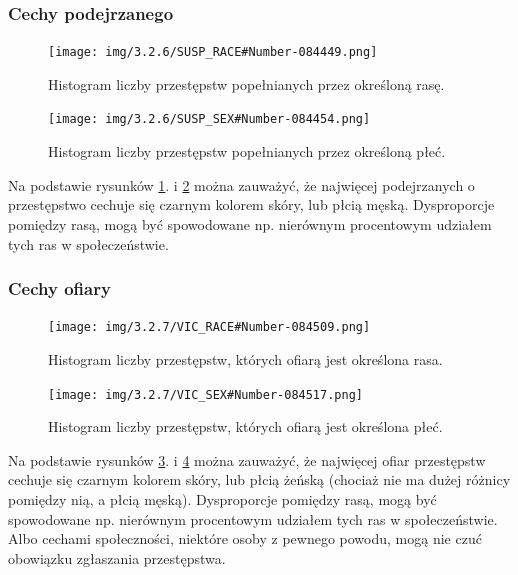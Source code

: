 \documentclass{classrep}
\begin{document}
{{            \subsubsection{Cechy podejrzanego} {
                \begin{figure}[!htbp]
                    \centering
                    \texttt{[image: img/3.2.6/SUSP\_RACE\#Number-084449.png]}
                    \caption{Histogram liczby przestępstw popełnianych przez określoną rasę.}
                    \label{susp_race}
                \end{figure}
                \begin{figure}[!htbp]
                    \centering
                    \texttt{[image: img/3.2.6/SUSP\_SEX\#Number-084454.png]}
                    \caption{Histogram liczby przestępstw popełnianych przez określoną płeć.}
                    \label{susp_sex}
                \end{figure}
                \FloatBarrier
                Na podstawie rysunków \ref{susp_race}. i \ref{susp_sex} można zauważyć, że najwięcej podejrzanych o przestępstwo cechuje się czarnym kolorem skóry, lub płcią męską. Dysproporcje pomiędzy rasą, mogą być spowodowane np. nierównym procentowym udziałem tych ras w społeczeństwie.
            }

            \subsubsection{Cechy ofiary} {
                 \begin{figure}[!htbp]
                    \centering
                    \texttt{[image: img/3.2.7/VIC\_RACE\#Number-084509.png]}
                    \caption{Histogram liczby przestępstw, których ofiarą jest określona rasa.}
                    \label{vic_race}
                \end{figure}
                \begin{figure}[!htbp]
                    \centering
                    \texttt{[image: img/3.2.7/VIC\_SEX\#Number-084517.png]}
                    \caption{Histogram liczby przestępstw, których ofiarą jest określona płeć.}
                    \label{vic_sex}
                \end{figure}
                \FloatBarrier
                
                Na podstawie rysunków \ref{vic_race}. i \ref{vic_sex} można zauważyć, że najwięcej ofiar przestępstw cechuje się czarnym kolorem skóry, lub płcią żeńską (chociaż nie ma dużej różnicy pomiędzy nią, a płcią męską). Dysproporcje pomiędzy rasą, mogą być spowodowane np. nierównym procentowym udziałem tych ras w społeczeństwie. Albo cechami społeczności, niektóre osoby z pewnego powodu, mogą nie czuć obowiązku zgłaszania przestępstwa.
            }
            
}}
\end{document}
